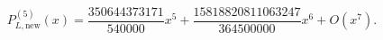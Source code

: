 \begin{equation}
P_{L,\mathrm{new}}^{(5)}(x)=\frac{350644373171}{540000}x^5+\frac{15818820811063247}{364500000}x^6+O(x^7).
\label{eq:new-scaling}
\end{equation}
